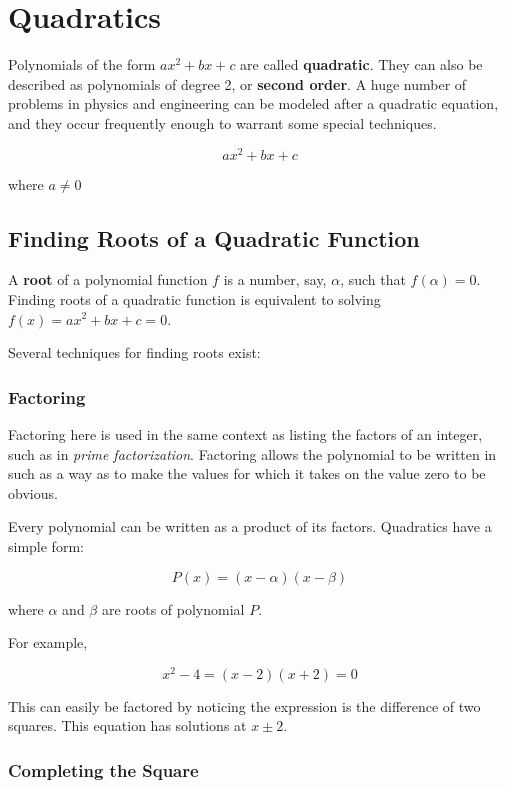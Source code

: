 \documentclass{standalone}
\begin{document}
\section{Quadratics}

Polynomials of the form $ax^2 + bx + c$ are called \textbf{quadratic}. They can
also be described as polynomials of degree 2, or \textbf{second order}. A huge
number of problems in physics and engineering can be modeled after a quadratic
equation, and they occur frequently enough to warrant some special techniques.

\[
  \boxed{ax^2 + bx + c}
\]

where $a \neq 0$

\subsection{Finding Roots of a Quadratic Function}

A \textbf{root} of a polynomial function $f$ is a number, say, $\alpha$, such
that $f(\alpha) = 0$. Finding roots of a quadratic function is equivalent to
solving $f(x) = ax^2 + bx + c = 0$.

Several techniques for finding roots exist:

\subsubsection{Factoring}

Factoring here is used in the same context as listing the factors of an integer,
such as in \emph{prime factorization}. Factoring allows the polynomial to be
written in such as a way as to make the values for which it takes on the value
zero to be obvious.

Every polynomial can be written as a product of its factors. Quadratics have a
simple form:

\[
  P(x) = (x - \alpha)(x - \beta)
\]

where $\alpha$ and $\beta$ are roots of polynomial $P$.

For example,

\[
  x^2 - 4 = (x - 2)(x + 2) = 0
\]

This can easily be factored by noticing the expression is the difference of two
squares. This equation has solutions at $x \pm 2$.


\subsubsection{Completing the Square}
\end{document}
